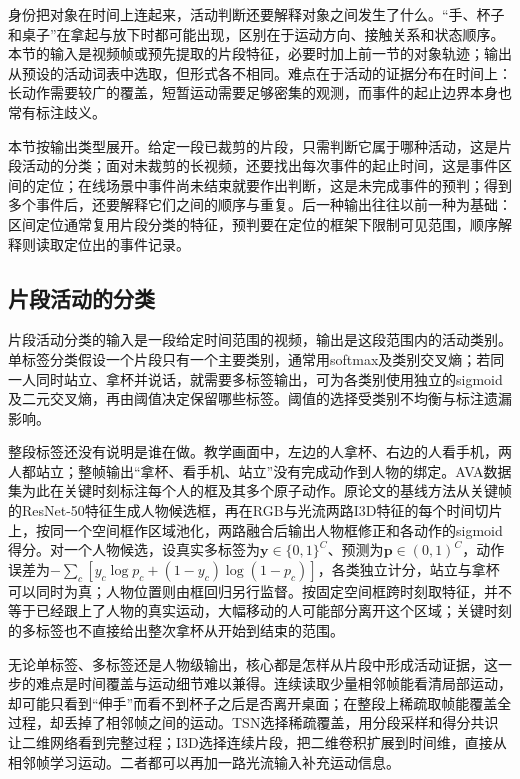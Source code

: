 身份把对象在时间上连起来，活动判断还要解释对象之间发生了什么。“手、杯子和桌子”在拿起与放下时都可能出现，区别在于运动方向、接触关系和状态顺序。本节的输入是视频帧或预先提取的片段特征，必要时加上前一节的对象轨迹；输出从预设的活动词表中选取，但形式各不相同。难点在于活动的证据分布在时间上：长动作需要较广的覆盖，短暂运动需要足够密集的观测，而事件的起止边界本身也常有标注歧义。

本节按输出类型展开。给定一段已裁剪的片段，只需判断它属于哪种活动，这是片段活动的分类；面对未裁剪的长视频，还要找出每次事件的起止时间，这是事件区间的定位；在线场景中事件尚未结束就要作出判断，这是未完成事件的预判；得到多个事件后，还要解释它们之间的顺序与重复。后一种输出往往以前一种为基础：区间定位通常复用片段分类的特征，预判要在定位的框架下限制可见范围，顺序解释则读取定位出的事件记录。

\subsection{片段活动的分类}
\label{sec:vision-video-activity-evidence}
\label{sec:vision-video-activity-output}
\label{sec:vision-video-clip-label}

片段活动分类的输入是一段给定时间范围的视频，输出是这段范围内的活动类别。单标签分类假设一个片段只有一个主要类别，通常用softmax及类别交叉熵；若同一人同时站立、拿杯并说话，就需要多标签输出，可为各类别使用独立的sigmoid及二元交叉熵，再由阈值决定保留哪些标签。阈值的选择受类别不均衡与标注遗漏影响。

整段标签还没有说明是谁在做。教学画面中，左边的人拿杯、右边的人看手机，两人都站立；整帧输出“拿杯、看手机、站立”没有完成动作到人物的绑定。AVA数据集为此在关键时刻标注每个人的框及其多个原子动作。原论文的基线方法从关键帧的ResNet-50特征生成人物候选框，再在RGB与光流两路I3D特征的每个时间切片上，按同一个空间框作区域池化，两路融合后输出人物框修正和各动作的sigmoid得分。对一个人物候选，设真实多标签为$\bm{y}\in\{0,1\}^{C}$、预测为$\bm{p}\in(0,1)^C$，动作误差为$-\sum_c[y_c\log p_c+(1-y_c)\log(1-p_c)]$，各类独立计分，站立与拿杯可以同时为真；人物位置则由框回归另行监督。按固定空间框跨时刻取特征，并不等于已经跟上了人物的真实运动，大幅移动的人可能部分离开这个区域；关键时刻的多标签也不直接给出整次拿杯从开始到结束的范围。

无论单标签、多标签还是人物级输出，核心都是怎样从片段中形成活动证据，这一步的难点是时间覆盖与运动细节难以兼得。连续读取少量相邻帧能看清局部运动，却可能只看到“伸手”而看不到杯子之后是否离开桌面；在整段上稀疏取帧能覆盖全过程，却丢掉了相邻帧之间的运动。TSN选择稀疏覆盖，用分段采样和得分共识让二维网络看到完整过程；I3D选择连续片段，把二维卷积扩展到时间维，直接从相邻帧学习运动。二者都可以再加一路光流输入补充运动信息。

